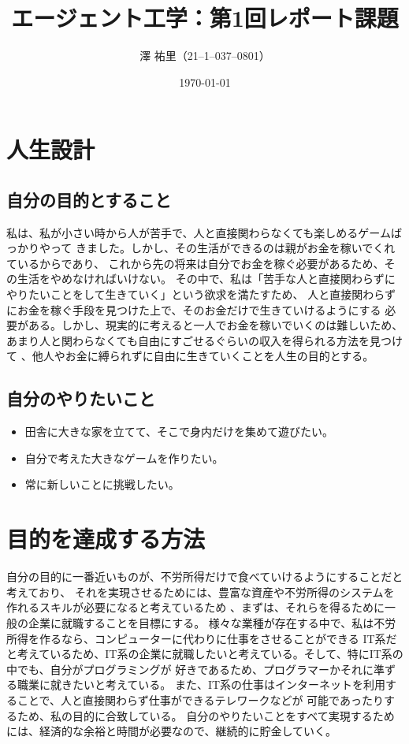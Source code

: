\documentclass{jsarticle}
\title{エージェント工学：第1回レポート課題}
\author{澤 \/ 祐里（21--1--037--0801）} %
\date{\today} %
\begin{document}
\maketitle

\section{人生設計}
\subsection{自分の目的とすること}
私は、私が小さい時から人が苦手で、人と直接関わらなくても楽しめるゲームばっかりやって
きました。しかし、その生活ができるのは親がお金を稼いでくれているからであり、
これから先の将来は自分でお金を稼ぐ必要があるため、その生活をやめなければいけない。
その中で、私は「苦手な人と直接関わらずにやりたいことをして生きていく」という欲求を満たすため、
人と直接関わらずにお金を稼ぐ手段を見つけた上で、そのお金だけで生きていけるようにする
必要がある。しかし、現実的に考えると一人でお金を稼いでいくのは難しいため、
あまり人と関わらなくても自由にすごせるぐらいの収入を得られる方法を見つけて
、他人やお金に縛られずに自由に生きていくことを人生の目的とする。
\subsection{自分のやりたいこと}
\begin{itemize}
  \item 田舎に大きな家を立てて、そこで身内だけを集めて遊びたい。
  \item 自分で考えた大きなゲームを作りたい。
  \item 常に新しいことに挑戦したい。
\end{itemize}

\section{目的を達成する方法}
自分の目的に一番近いものが、不労所得だけで食べていけるようにすることだと考えており、
それを実現させるためには、豊富な資産や不労所得のシステムを作れるスキルが必要になると考えているため
、まずは、それらを得るために一般の企業に就職することを目標にする。
様々な業種が存在する中で、私は不労所得を作るなら、コンピューターに代わりに仕事をさせることができる
IT系だと考えているため、IT系の企業に就職したいと考えている。そして、特にIT系の中でも、自分がプログラミングが
好きであるため、プログラマーかそれに準ずる職業に就きたいと考えている。
また、IT系の仕事はインターネットを利用することで、人と直接関わらず仕事ができるテレワークなどが
可能であったりするため、私の目的に合致している。
自分のやりたいことをすべて実現するためには、経済的な余裕と時間が必要なので、継続的に貯金していく。
\end{document}

